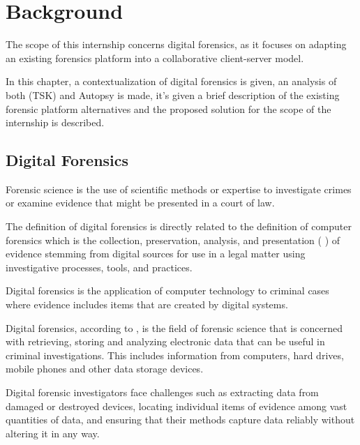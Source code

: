 
\chapter{Background}
\label{ch:background}

The scope of this internship concerns digital forensics, as it focuses on adapting an existing forensics platform into a collaborative client-server model.

In this chapter, a contextualization of digital forensics is given, an analysis of both  (TSK) \cite{sleuthkit} and Autopsy is made, it's given a brief description of
the existing forensic platform alternatives and the proposed solution for the scope of the internship is described.

\section{Digital Forensics}

Forensic science is the use of scientific methods or expertise to investigate crimes
or examine evidence that might be presented in a court of law.

The definition of digital forensics is directly related to the definition of
computer forensics which is the collection, preservation, analysis,
and presentation ( \cite{daniels}) of evidence stemming from digital sources for use in a legal matter
using investigative processes, tools, and practices.

Digital forensics is the application of computer technology to criminal cases where evidence
includes items that are created by digital systems.

Digital forensics, according to \citeauthor{nist} \cite{nist}, is the field of forensic science that is concerned with retrieving,
storing and analyzing electronic data that can be useful in criminal investigations.
This includes information from computers, hard drives, mobile phones and other data
storage devices.

Digital forensic investigators face challenges such as extracting data from damaged or destroyed
devices, locating individual items of evidence among vast quantities of data,
and ensuring that their methods capture data reliably without altering it in any way.

